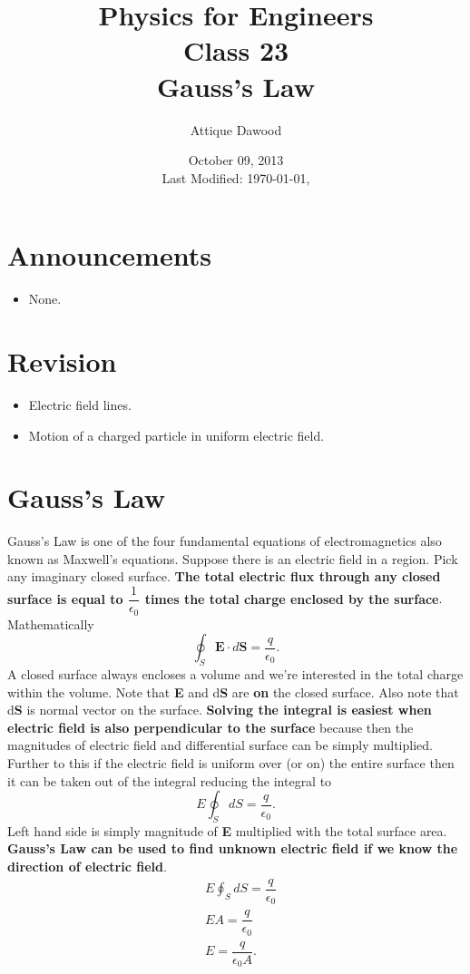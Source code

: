 \documentclass[12pt,a4paper]{article}
\title{\vspace{-3cm}Physics for Engineers\\Class 23\\Gauss's Law}
\author{Attique Dawood}
\date{October 09, 2013\\[0.2cm] Last Modified: \today, \currenttime}
\begin{document}
\maketitle
\section{Announcements}
\begin{itemize}
\item None.
\end{itemize}
\section{Revision}
\begin{itemize}
\item Electric field lines.
\item Motion of a charged particle in uniform electric field.
\end{itemize}
\section{Gauss's Law}
Gauss's Law is one of the four fundamental equations of electromagnetics also known as Maxwell's equations. Suppose there is an electric field in a region. Pick any imaginary closed surface. \textbf{The total electric flux through any closed surface is equal to $\dfrac{1}{\epsilon_0}$ times the total charge enclosed by the surface}. Mathematically
\begin{equation}
\oint_{S}\textbf{E}\cdot d\textbf{S}=\dfrac{q}{\epsilon_0}.
\end{equation}
A closed surface always encloses a volume and we're interested in the total charge within the volume. Note that \textbf{E} and d\textbf{S} are \textbf{on} the closed surface. Also note that d\textbf{S} is normal vector on the surface. \textbf{Solving the integral is easiest when electric field is also perpendicular to the surface} because then the magnitudes of electric field and differential surface can be simply multiplied. Further to this if the electric field is uniform over (or on) the entire surface then it can be taken out of the integral reducing the integral to
\begin{equation}
E\oint_{S}dS=\dfrac{q}{\epsilon_0}.
\end{equation}
Left hand side is simply magnitude of \textbf{E} multiplied with the total surface area. \textbf{Gauss's Law can be used to find unknown electric field if we know the direction of electric field}.
\begin{equation}
\begin{split}
&E\oint_{S}dS=\dfrac{q}{\epsilon_0}\\
&EA=\dfrac{q}{\epsilon_0}\\
&E=\dfrac{q}{\epsilon_0A}.
\end{split}
\end{equation}
\end{document}
